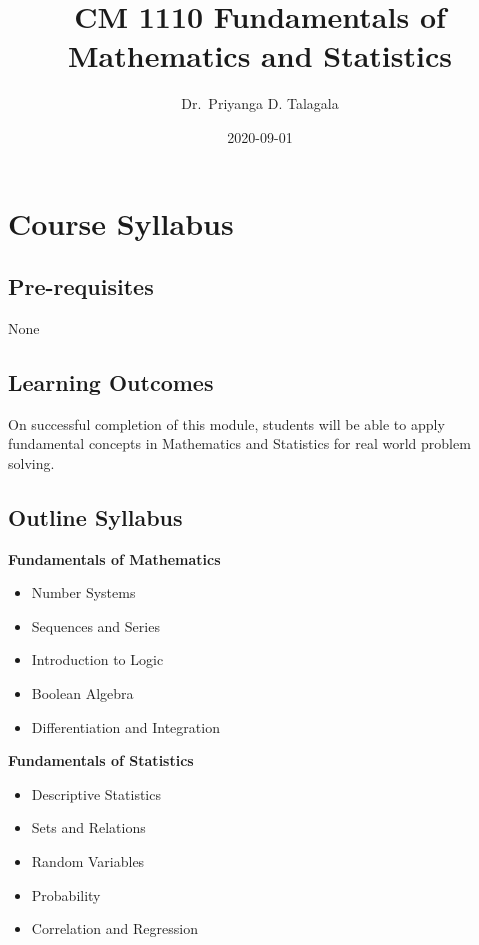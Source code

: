 \documentclass[]{book}
\title{CM 1110 Fundamentals of Mathematics and Statistics}
\author{Dr.~Priyanga D. Talagala}
\date{2020-09-01}
\providecommand{\tightlist}{%
  \setlength{\itemsep}{0pt}\setlength{\parskip}{0pt}}
\begin{document}
\maketitle

{
\setcounter{tocdepth}{1}
\tableofcontents
}
\hypertarget{course-syllabus}{%
\chapter*{Course Syllabus}\label{course-syllabus}}

\hypertarget{pre-requisites}{%
\section*{Pre-requisites}\label{pre-requisites}}

None

\hypertarget{learning-outcomes}{%
\section*{Learning Outcomes}\label{learning-outcomes}}

On successful completion of this module, students will be able to apply fundamental concepts in Mathematics and Statistics for real world problem solving.

\hypertarget{outline-syllabus}{%
\section*{Outline Syllabus}\label{outline-syllabus}}

\textbf{Fundamentals of Mathematics}

\begin{itemize}
\tightlist
\item
  Number Systems
\item
  Sequences and Series
\item
  Introduction to Logic
\item
  Boolean Algebra
\item
  Differentiation and Integration
\end{itemize}

\textbf{Fundamentals of Statistics}

\begin{itemize}
\tightlist
\item
  Descriptive Statistics
\item
  Sets and Relations
\item
  Random Variables
\item
  Probability
\item
  Correlation and Regression
\end{itemize}
\end{document}
